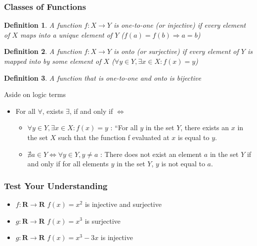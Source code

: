 \documentclass[aspectratio=169, handout]{beamer}
\newtheorem{defn}{Definition}
\numberwithin{equation}{section}
\begin{document}
\begin{frame}
\frametitle{Classes of Functions}

\begin{defn}
A function $f: X\rightarrow Y$ is \textit{one-to-one} (or injective) if every element of $X$ maps into a unique element of $Y$ ($f(a)=f(b)\Rightarrow a=b$)
\end{defn}
\pause

\begin{defn}
A function $f: X\rightarrow Y$ is \textit{onto} (or surjective) if every element of $Y$ is mapped into by some element of $X$ ($\forall y\in Y, \exists x\in X: f(x)=y$) \pause
\end{defn}

\begin{defn}
A function that is \emph{one-to-one} and \emph{onto} is \emph{bijective}
\end{defn}

\end{frame}

\begin{frame}{Aside on logic terms}

\begin{itemize}
\item For all $\forall$, exists $\exists$, if and only if $\iff$
\begin{itemize}

\item $\forall y\in Y, \exists x\in X: f(x)=y$ : ``For all $y$ in the set $Y$, there exists an $x$ in the set $X$ such that the function f evaluated at $x$ is equal to $y$.

\item $\nexists a \in Y \iff \forall y \in Y,  y\neq a$ : There does not exist an element $a$ in the set $Y$ if and only if for all elements $y$ in the set $Y$, $y$ is not equal to $a$.
\end{itemize}
\end{itemize}
\end{frame}



\begin{frame}
\frametitle{Test Your Understanding}

\begin{itemize}
\item $f: \mathbf{R}\rightarrow \mathbf{R}$ $f(x)=x^2$ is injective and surjective
\item $g: \mathbf{R}\rightarrow \mathbf{R}$ $f(x)=x^3$ is surjective
\item  $g: \mathbf{R}\rightarrow \mathbf{R}$ $f(x)=x^3-3x$ is injective
\end{itemize}
   
\end{frame}
\end{document}
